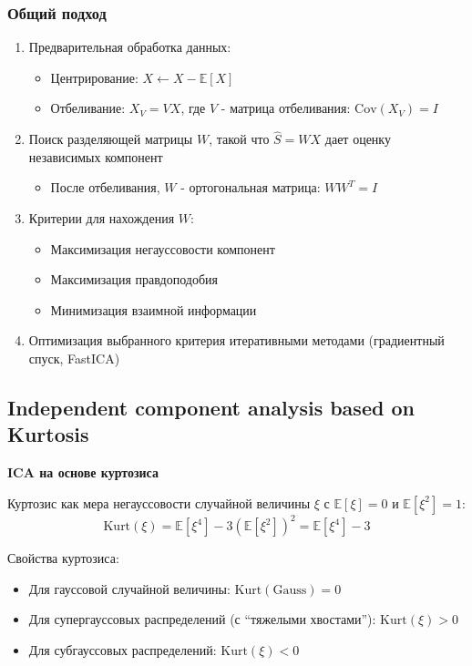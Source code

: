 \documentclass[a4paper,12pt]{article}
\begin{document}
\subsubsection{Общий подход}
\begin{enumerate}
    \item Предварительная обработка данных:
    \begin{itemize}
        \item Центрирование: $X \leftarrow X - \mathbb{E}[X]$
        \item Отбеливание: $X_V = VX$, где $V$ - матрица отбеливания: $\text{Cov}(X_V) = I$
    \end{itemize}

    \item Поиск разделяющей матрицы $W$, такой что $\hat{S} = WX$ дает оценку независимых компонент
    \begin{itemize}
        \item После отбеливания, $W$ - ортогональная матрица: $W W^T = I$
    \end{itemize}

    \item Критерии для нахождения $W$:
    \begin{itemize}
        \item Максимизация негауссовости компонент
        \item Максимизация правдоподобия
        \item Минимизация взаимной информации
    \end{itemize}

    \item Оптимизация выбранного критерия итеративными методами (градиентный спуск, FastICA)
\end{enumerate}

\subsection{Independent component analysis based on Kurtosis}

\textbf{ICA на основе куртозиса}

Куртозис как мера негауссовости случайной величины $\xi$ с $\mathbb{E}[\xi] = 0$ и $\mathbb{E}[\xi^2] = 1$:
$$\text{Kurt}(\xi) = \mathbb{E}[\xi^4] - 3(\mathbb{E}[\xi^2])^2 = \mathbb{E}[\xi^4] - 3$$

Свойства куртозиса:
\begin{itemize}
    \item Для гауссовой случайной величины: $\text{Kurt}(\text{Gauss}) = 0$
    \item Для супергауссовых распределений (с ``тяжелыми хвостами''): $\text{Kurt}(\xi) > 0$
    \item Для субгауссовых распределений: $\text{Kurt}(\xi) < 0$
\end{itemize}
\end{document}
